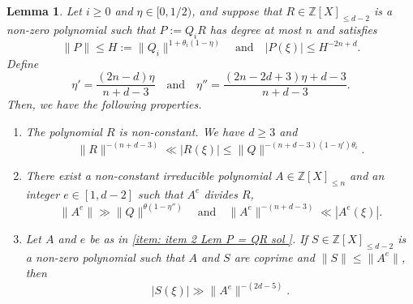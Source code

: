 \documentclass[JEP,XML,SOM,Unicode,NoFloatCountersInSection,published]{cedram}
\newcommand\bZ{\mathbb{Z}}
\newcommand{\normH}[1]{\|#1\|}
\newcommand\AND{\quad\text{and}\quad}
\theoremstyle{definition}
\theoremstyle{plain}
\newtheorem{Lem}[Def]{Lemma}
\begin{document}
\begin{Lem}
\label{Lem: P = QR grand bonne approx}
Let $i\geq 0$ and $\eta\in[0,1/2)$, and suppose that $R\in\bZ[X]_{\leq d-2}$ is a non-zero polynomial such that $P := Q_iR$ has degree at most $n$ and satisfies
\begin{equation}
\label{eq : systeme dio pour P = QR}
\normH{P} \leq H:= \normH{Q_i}^{1+\theta_i(1-\eta)} \AND |P(\xi)| \leq H^{-2n+d}.
\end{equation}
Define
\begin{equation*}
\eta' = \frac{(2n-d)\eta}{n+d-3} \AND \eta'' = \frac{(2n-2d+3)\eta+d-3}{n+d-3}.
\end{equation*}
Then, we have the following properties.
\begin{enumerate}
\item \label{item: item 1 Lem P = QR sol }
The polynomial $R$ is non-constant. We have $d\geq 3$ and
\begin{equation}
\label{eq Prop: P = QR grand bonne approx: R(xi) revisite}
\normH{R}^{-(n+d-3)} \ll |R(\xi)| \leq \normH{Q}^{-(n+d-3)(1-\eta')\theta_i}.
\end{equation}
\item \label{item: item 2 Lem P = QR sol }
There exist a non-constant irreducible polynomial $A\in\bZ[X]_{\leq n}$ and an integer $e \in[1,d-2]$ such that $A^e$ divides $R$,
\begin{equation}
\label{eq Prop: P = QR grand bonne approx: H(A^e) revisite}
\normH{A^e} \gg \normH{Q}^{\theta(1-\eta'')} \AND \normH{A^e}^{-(n+d-3)} \ll |A^e(\xi)|.
\end{equation}
\item Let $A$ and $e$ be as in \eqref{item: item 2 Lem P = QR sol }. If $S\in\bZ[X]_{\leq d-2}$ is a non-zero polynomial such that $A$ and $S$ are coprime and $\normH{S}\leq \normH{A^e}$, then
\begin{equation}
\label{eq Prop: P = QR grand bonne approx: H(S) revisite}
|S(\xi)| \gg \normH{A^e}^{-(2d-5)}.
\end{equation}
\end{enumerate}
\end{Lem}
\end{document}
